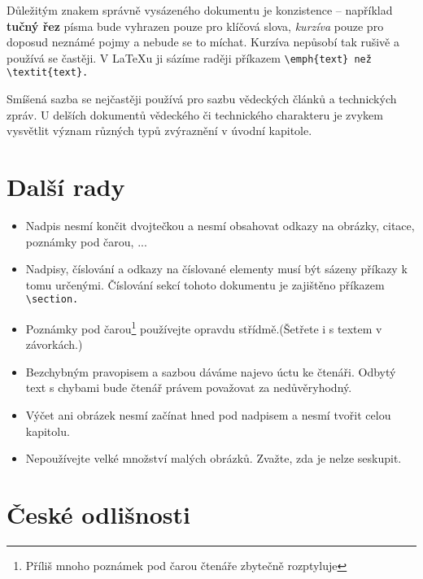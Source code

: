 \documentclass[a4paper, 10pt, twocolumn]{article}
\begin{document}
    \par
    
    Důležitým znakem správně vysázeného dokumentu je konzistence -- například \textbf{tučný řez} písma bude vyhrazen pouze pro klíčová slova, \textit{kurzíva}
    pouze pro doposud neznámé pojmy a nebude se to míchat.
    Kurzíva nepůsobí tak rušivě a používá se častěji.
    V \LaTeX u ji sázíme raději příkazem \verb=\emph{text} než \textit{text}.= 
    
    \par
    
    Smíšená sazba se nejčastěji používá pro sazbu vědeckých článků a technických zpráv.
    U delších dokumentů vědeckého či technického charakteru je zvykem vysvětlit 
    význam různých typů zvýraznění v úvodní kapitole.
    
    \section{Další rady}
        \begin{itemize}
            \item Nadpis nesmí končit dvojtečkou a nesmí obsahovat odkazy na 
            obrázky, citace, poznámky pod čarou, ...
            \item Nadpisy, číslování a odkazy na číslované elementy musí být sázeny 
            příkazy k tomu určenými. Číslování sekcí tohoto dokumentu je zajištěno 
            příkazem \verb=\section.=
            \item Poznámky pod čarou\footnote{Příliš mnoho poznámek pod čarou čtenáře zbytečně rozptyluje} používejte opravdu střídmě.(Šetřete i s textem 
            v závorkách.) %
            \item Bezchybným pravopisem a sazbou dáváme najevo úctu ke čtenáři.
            Odbytý text s chybami bude čtenář právem považovat za nedůvěryhodný.
            \item Výčet ani obrázek nesmí začínat hned pod nadpisem a nesmí tvořit 
            celou kapitolu.
            \item Nepoužívejte velké množství malých obrázků.
            Zvažte, zda je nelze seskupit.
        \end{itemize}
    
    \section{České odlišnosti}
    
\end{document}
